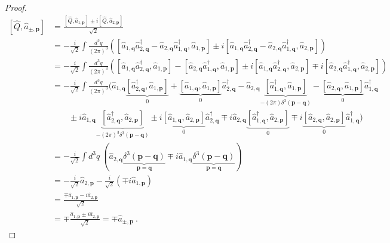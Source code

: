 \begin{proof}
\begin{equation*}
\begin{aligned}
            [\hat Q, \hat a_{\pm, \mathbf p}] & = \frac{[\hat Q, \hat a_{1, \mathbf p}] \pm i [\hat Q, \hat a_{2, \mathbf p}]}{\sqrt{2}} \\ & = - \frac{i}{\sqrt{2}} \int \frac{d^3 q}{(2\pi)^3} ( [\hat a_{1, \mathbf q} \hat a_{2, \mathbf q}^\dagger - \hat a_{2, \mathbf q} \hat a_{1, \mathbf q}^\dagger, \hat a_{1, \mathbf p}]  \pm i  [\hat a_{1, \mathbf q} \hat a_{2, \mathbf q}^\dagger - \hat a_{2, \mathbf q} \hat a_{1, \mathbf q}^\dagger, \hat a_{2, \mathbf p}]) \\ & = - \frac{i}{\sqrt{2}} \int \frac{d^3 q}{(2\pi)^3} ( [\hat a_{1, \mathbf q} \hat a_{2, \mathbf q}^\dagger, \hat a_{1, \mathbf p}] - [\hat a_{2, \mathbf q} \hat a_{1, \mathbf q}^\dagger, \hat a_{1, \mathbf p}] \pm i [\hat a_{1, \mathbf q} \hat a_{2, \mathbf q}^\dagger, \hat a_{2, \mathbf p}] \mp i [\hat a_{2, \mathbf q} \hat a_{1, \mathbf q}^\dagger, \hat a_{2, \mathbf p}]) \\ & = - \frac{i}{\sqrt{2}} \int \frac{d^3 q}{(2\pi)^3} ( \hat a_{1, \mathbf q} \underbrace{[\hat a_{2, \mathbf q}^\dagger, \hat a_{1, \mathbf p}]}_0 + \underbrace{[\hat a_{1, \mathbf q}, \hat a_{1, \mathbf p}]}_0 \hat a_{2, \mathbf q}^\dagger - \hat a_{2, \mathbf q}  \underbrace{[\hat a_{1, \mathbf q}^\dagger, \hat a_{1, \mathbf p}]}_{- (2\pi) \delta^3 (\mathbf p - \mathbf q)} - \underbrace{[\hat a_{2, \mathbf q}, \hat a_{1, \mathbf p}]}_0 \hat a_{1, \mathbf q}^\dagger \\ & \qquad \pm i \hat a_{1, \mathbf q} \underbrace{[\hat a_{2, \mathbf q}^\dagger, \hat a_{2, \mathbf p}]}_{- (2\pi)^3 \delta^3 (\mathbf p - \mathbf q)} \pm i \underbrace{[\hat a_{1, \mathbf q} , \hat a_{2, \mathbf p}]}_0 \hat a_{2, \mathbf q}^\dagger \mp i \hat a_{2, \mathbf q} \underbrace{[ \hat a_{1, \mathbf q}^\dagger, \hat a_{2, \mathbf p}]}_0 \mp i \underbrace{[\hat a_{2, \mathbf q}, \hat a_{2, \mathbf p}]}_0 \hat a_{1, \mathbf q}^\dagger) \\ & = - \frac{i}{\sqrt{2}} \int d^3 q ~ ( \hat a_{2, \mathbf q} \underbrace{\delta^3 (\mathbf p - \mathbf q)}_{\mathbf p = \mathbf q} \mp i \hat a_{1, \mathbf q} \underbrace{\delta^3 (\mathbf p - \mathbf q)}_{\mathbf p = \mathbf q} ) \\ & = - \frac{i}{\sqrt{2}} \hat a_{2, \mathbf p} - \frac{i}{\sqrt{2}} (\mp i \hat a_{1, \mathbf p}) \\ & = \frac{\mp \hat a_{1, \mathbf p} - i \hat a_{2, \mathbf p}}{\sqrt{2}} \\ & = \mp \frac{\hat a_{1, \mathbf p} \pm i \hat a_{2, \mathbf p}}{\sqrt{2}} = \mp \hat a_{\pm, \mathbf p} ~.
        \end{aligned}
        \end{equation*}


\end{proof}
